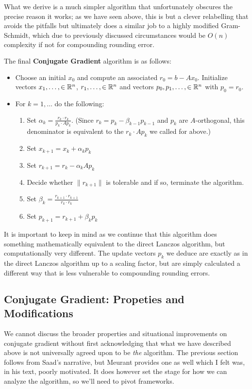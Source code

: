\documentclass[11pt]{article}
\begin{document}
What we derive is a much simpler algorithm that unfortunately obscures the precise reason it works; as we have seen above, this is but a clever relabelling that avoids the pitfalls but ultimately does a similar job to a highly modified Gram-Schmidt, which due to previously discussed circumstances would be $O(n)$ complexity if not for compounding rounding error.

The final \textbf{Conjugate Gradient} algorithm is as follows: \begin{itemize}
\item Choose an initial $x_0$ and compute an associated $r_0 = b - Ax_0$. Initialize vectors $x_1,\dots, \in \mathbb{R}^n$, $r_1,\dots, \in \mathbb{R}^n$ and vectors $p_0,p_1,\dots, \in \mathbb{R}^n$ with $p_0 = r_0$.
\item For $k = 1, \dots$ do the following: \begin{enumerate}
	\item Set $\alpha_k = \frac{r_k \cdot r_k}{p_k \cdot A p_k}$. (Since $r_k = p_k - \beta_{k-1} p_{k-1}$ and $p_k$ are $A$-orthogonal, this denominator is equivalent to the $r_k \cdot A p_k$ we called for above.)
	\item Set $x_{k+1} = x_k + \alpha_k p_k$
	\item Set $r_{k+1} = r_k - \alpha_k A p_k$
	\item Decide whether $\lVert r_{k+1} \rVert$ is tolerable and if so, terminate the algorithm.
	\item Set $\beta_k = \frac{r_{k+1} \cdot r_{k+1} }{r_k \cdot r_k}$
	\item Set $p_{k+1} = r_{k+1} + \beta_k p_k$
\end{enumerate}
\end{itemize}

It is important to keep in mind as we continue that this algorithm does something mathematically equivalent to the direct Lanczos algorithm, but computationally very different. The update vectors $p_k$ we deduce are exactly as in the direct Lanczos algorithm up to a scaling factor, but are simply calculated a different way that is less vulnerable to compounding rounding errors.

\subsection{Conjugate Gradient: Propeties and Modifications}

We cannot discuss the broader properties and situational improvements on conjugate gradient without first acknowledging that what we have described above is not universally agreed upon to be \emph{the} algorithm. The previous section follows from Saad's narrative, but Meurant provides one as well which I felt was, in his text, poorly motivated. It does however set the stage for how we can analyze the algorithm, so we'll need to pivot frameworks.
\end{document}
